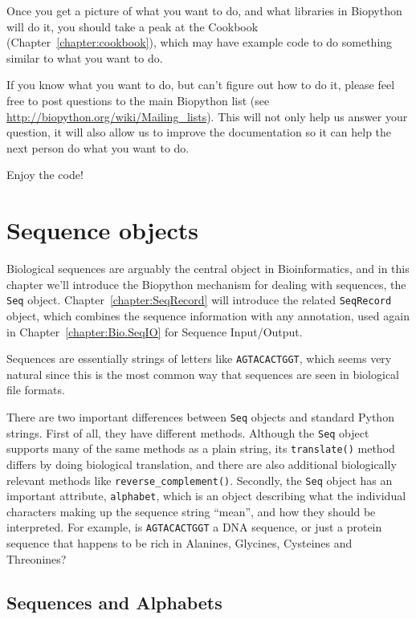 \documentclass{report}
\begin{document}
Once you get a picture of what you want to do, and what libraries in Biopython will do it, you should take a peak at the Cookbook (Chapter~\ref{chapter:cookbook}), which may have example code to do something similar to what you want to do.

If you know what you want to do, but can't figure out how to do it, please feel free to post questions to the main Biopython list (see \url{http://biopython.org/wiki/Mailing_lists}). This will not only help us answer your question, it will also allow us to improve the documentation so it can help the next person do what you want to do.

Enjoy the code!

\chapter{Sequence objects}
\label{chapter:Bio.Seq}

Biological sequences are arguably the central object in Bioinformatics, and in this chapter we'll introduce the Biopython mechanism for dealing with sequences, the \verb|Seq| object.
Chapter~\ref{chapter:SeqRecord} will introduce the related \verb|SeqRecord| object, which combines the sequence information with any annotation, used again in Chapter~\ref{chapter:Bio.SeqIO} for Sequence Input/Output.

Sequences are essentially strings of letters like \verb|AGTACACTGGT|, which seems very natural since this is the most common way that sequences are seen in biological file formats.

There are two important differences between \verb|Seq| objects and standard Python strings.
First of all, they have different methods.  Although the \verb|Seq| object supports many of the same methods as a plain string, its \verb|translate()| method differs by doing biological translation, and there are also additional biologically relevant methods like \verb|reverse_complement()|.
Secondly, the \verb|Seq| object has an important attribute, \verb|alphabet|, which is an object describing what the individual characters making up the sequence string ``mean'', and how they should be interpreted.  For example, is \verb|AGTACACTGGT| a DNA sequence, or just a protein sequence that happens to be rich in Alanines, Glycines, Cysteines
and Threonines?

\section{Sequences and Alphabets}
\end{document}
